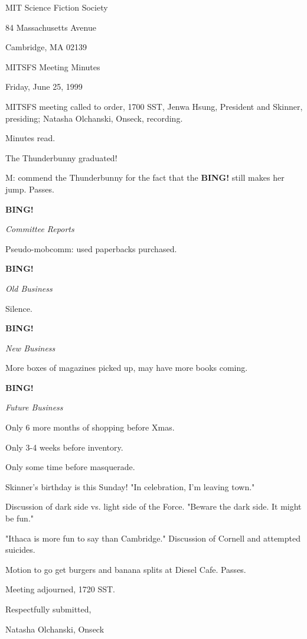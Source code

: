 \documentclass[12pt]{article}
\newcommand{\bing}{{\bf BING!} }
\newcommand{\goto}[1]{\bing \vskip 12pt \centerline{{\em{#1}}}}
\begin{document}
\begin{center}

MIT Science Fiction Society 

84 Massachusetts Avenue

Cambridge, MA 02139

\vspace{12pt}

MITSFS Meeting Minutes 

Friday, June 25, 1999

\end{center}
 
\vspace{18pt}

\setlength{\parskip}{6pt}

\noindent
MITSFS meeting called to order, 1700 SST,
Jenwa Hsung, President and Skinner, presiding; Natasha Olchanski, Onseck, recording.

Minutes read.

The Thunderbunny graduated!

M: commend the Thunderbunny for the fact that the \bing still makes her jump. Passes.

\goto{Committee Reports}

Pseudo-mobcomm: used paperbacks purchased.

\goto{Old Business}

Silence.

\goto{New Business}

More boxes of magazines picked up, may have more books coming.

\goto{Future Business}

Only 6 more months of shopping before Xmas.

Only 3-4 weeks before inventory.

Only some time before masquerade.

Skinner's birthday is this Sunday! "In celebration, I'm leaving town."

Discussion of dark side vs. light side of the Force. "Beware the dark side. It might be fun."

"Ithaca is more fun to say than Cambridge." Discussion of Cornell and attempted suicides.

Motion to go get burgers and banana splits at Diesel Cafe. Passes.

\vspace{12pt}

\noindent
Meeting adjourned, 1720 SST.

\vspace{18pt}

\centerline{Respectfully submitted,}
\centerline{Natasha Olchanski, Onseck}
\end{document}
